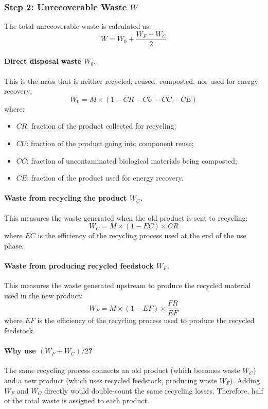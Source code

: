 \documentclass{NoteThesis/note-thesis}
\begin{document}
\subsubsection{Step 2: Unrecoverable Waste $W$}

The total unrecoverable waste is calculated as:
\[
    W = W_0 + \frac{W_F + W_C}{2}
\]

\paragraph{Direct disposal waste $W_0$.}
This is the mass that is neither recycled, reused, composted, nor used for energy recovery:
\[
    W_0 = M \times (1 - CR - CU - CC - CE)
\]
where:
\begin{itemize}
    \item $CR$: fraction of the product collected for recycling;
    \item $CU$: fraction of the product going into component reuse;
    \item $CC$: fraction of uncontaminated biological materials being composted;
    \item $CE$: fraction of the product used for energy recovery.
\end{itemize}

\paragraph{Waste from recycling the product $W_C$.}
This measures the waste generated when the old product is sent to recycling:
\[
    W_C = M \times (1 - EC) \times CR
\]
where $EC$ is the efficiency of the recycling process used at the end of the use phase.

\paragraph{Waste from producing recycled feedstock $W_F$.}
This measures the waste generated upstream to produce the recycled material used in the new product:
\[
    W_F = M \times (1 - EF) \times \frac{FR}{EF}
\]
where $EF$ is the efficiency of the recycling process used to produce the recycled feedstock.

\paragraph{Why use $(W_F + W_C)/2$?}
The same recycling process connects an old product (which becomes waste $W_C$) and a new product (which uses recycled feedstock, producing waste $W_F$).
Adding $W_F$ and $W_C$ directly would double-count the same recycling losses.
Therefore, half of the total waste is assigned to each product.
\end{document}
